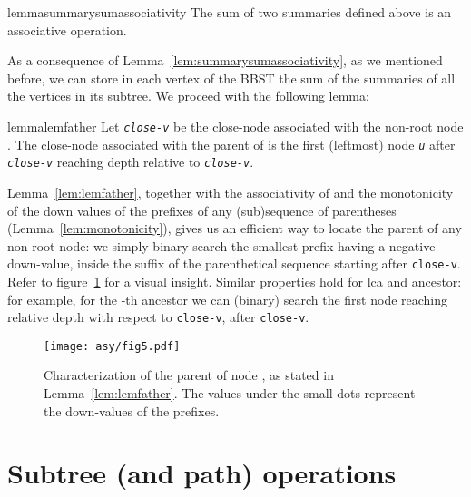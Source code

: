 \documentclass[a4paper,USenglish]{lipics}
\newcommand{\var}[1]{\textrm{\texttt{#1}}}
\begin{document}
		
\begin{restatable}{lemma}{summarysumassociativity}
			\label{lem:summarysumassociativity}
			The sum of two summaries defined above is an associative operation.
\end{restatable}
		
		As a consequence of Lemma~\ref{lem:summarysumassociativity},  as we mentioned before, we can store in each vertex of the BBST the sum of the summaries of all the vertices in its subtree. We proceed with the following lemma:
\begin{restatable}{lemma}{lemfather}
		\label{lem:lemfather}
		Let \emph{\var{close-v}} be the close-node associated with the non-root node . The close-node associated with the parent of  is the first (leftmost) node \emph{\var{u}} after \emph{\var{close-v}} reaching depth  relative to \emph{\var{close-v}}.
\end{restatable}
Lemma~\ref{lem:lemfather}, together with the associativity of  and the monotonicity of the down values of the prefixes of any (sub)sequence of parentheses (Lemma~\ref{lem:monotonicity}), gives us an efficient way to locate the parent of any non-root node: we simply binary search the smallest prefix having a negative down-value, inside the suffix of the parenthetical sequence starting after \var{close-v}. Refer to figure~\ref{fig:father} for a visual insight. Similar properties hold for lca and ancestor: for example, for the -th ancestor we can (binary) search the first node reaching relative depth  with respect to \var{close-v}, after \var{close-v}.
\begin{figure}[t]
\centering\texttt{[image: asy/fig5.pdf]}
\caption{Characterization of the parent of node , as stated in Lemma~\ref{lem:lemfather}. The values under the small dots represent the down-values of the prefixes.\label{fig:father}}
\end{figure}
		
\section{Subtree (and path) operations}
\label{sec:operations}
\end{document}
